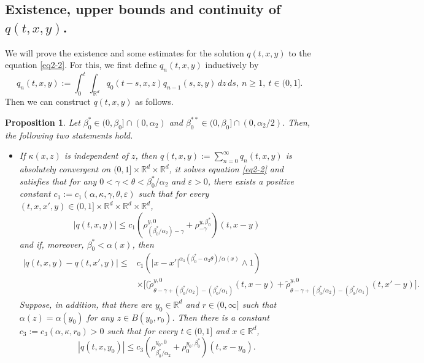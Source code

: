 \documentclass[a4paper,11pt]{amsart}
\renewcommand{\le}{\leqslant}
\renewcommand{\ge}{\geqslant}
\newcommand{\R}{\mathds R}
\newcommand{\B}{\beta}
\newcommand{\K}{\kappa}
\newcommand{\A}{\alpha}
\newcommand{\G}{\gamma}
\newtheorem{proposition}[theorem]{Proposition}
\theoremstyle{definition}
\begin{document}
\subsection{Existence, upper bounds and continuity of $q(t,x,y)$.}
We will prove the existence and some estimates for the solution $q(t,x,y)$ to the equation
\eqref{eq2-2}. For this, we first define $q_n(t,x,y)$ inductively by
\begin{equation}\label{eq3-1}
q_n(t,x,y):=\int_0^t\int_{\R^d}q_0(t-s,x,z)q_{n-1}(s,z,y)\,dz\,ds,\ n\ge1,\ t\in(0,1].
\end{equation}
Then we can construct $q(t,x,y)$ as follows.
\begin{proposition}\label{p3-1} Let $\B_0^*\in(0,\B_0]\cap(0,{\alpha_2})$ and $\B_0^{**} \in (0,\B_0]\cap(0,{\alpha_2}/{2})$. Then, the following two statements hold.
\begin{itemize}
\item[(1)] If $\kappa(x,z)$ is independent of $z$, then $q(t,x,y):=\sum_{n=0}^{\infty}q_n(t,x,y)$ is
absolutely convergent on $(0,1]\times \R^d\times \R^d$, it solves equation \eqref{eq2-2} and satisfies that for any $0<\gamma<\theta<{\beta^*_0}/{\A_2}$ and
$\varepsilon>0$,
there exists a positive constant $c_1:=c_1(\A,\K,\G,\theta,\varepsilon)$ such that
for every $(t,x,x',y)\in (0,1]\times \R^d\times \R^d \times \R^d$,
\begin{equation}\label{p3-1-1}
|q(t,x,y)|\le c_1\left(\rho^{y,0}_{{(\B_0^*/\A_2)}-\gamma}+\rho^{y,\B_0^*}_{-\gamma}\right)(t,x-y)
\end{equation} and if, moreover, $\B_0^*<\A(x)$, then
\begin{equation}\label{p3-1-1a}
\begin{split}
 |q(t,x,y)-q(t,x',y)|\le & c_1\left(|x-x'|^{{\A_1(\B^*_0-\A_2\theta)}/{\A(x)}}\wedge 1\right)\\
   &\times\Big[\Big(\tilde \rho^{y,0}_{\theta-\gamma+(\B_0^{*}/\A_2)-(\B_0^*/\A_1)}
(t,x-y)+\tilde \rho^{y,0}_{\theta-\gamma+
(\B_0^{*}/\A_2)-(\B_0^*/\A_1)}(t,x'-y)\Big].
\end{split}
\end{equation}
Suppose, in addition, that there are  $y_0\in \R^d$ and $r\in(0,\infty]$ such that  $\alpha(z)=\alpha(y_0)$ for any $z \in B(y_0,r_0)$. Then there is a constant
$c_3:=c_3(\A,\K,r_0)>0$ such that for every $t\in (0,1]$ and $x \in \R^d$,
\begin{equation}\label{p3-1-2b}
|q(t,x,y_0)|\le c_3\left(\rho^{y_0,0}_{{\B_0^*/\A_2}}+\rho^{y_0,\B_0^*}_{0}\right)(t,x-y_0).
\end{equation}


\end{itemize}
\end{proposition}
\end{document}
